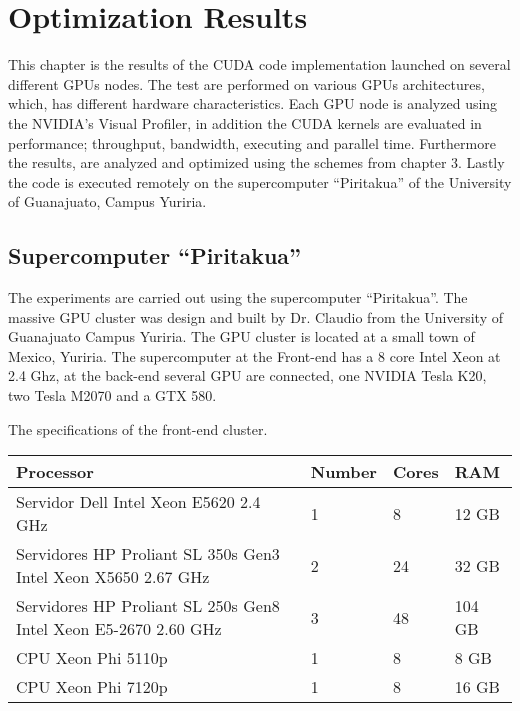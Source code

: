 
\chapter{Optimization Results} %

\label{Optimization Results} %



This chapter is the results of the CUDA code implementation launched on several different GPUs nodes. The test are performed on various GPUs architectures, which, has different hardware characteristics. Each GPU node is analyzed using the NVIDIA's Visual Profiler, in addition the CUDA kernels are evaluated in performance; throughput, bandwidth, executing and parallel time. Furthermore the results, are analyzed and optimized using the schemes from chapter 3. Lastly the code is executed remotely on the supercomputer ``Piritakua'' of the  University of Guanajuato, Campus Yuriria.

\section{Supercomputer ``Piritakua''}

The experiments are carried out using the supercomputer “Piritakua”. The massive GPU cluster was design and built by Dr. Claudio from the University of Guanajuato Campus Yuriria. The GPU cluster is located at a small town of Mexico, Yuriria. The supercomputer at the Front-end has a 8 core Intel Xeon at 2.4 Ghz, at the back-end several GPU are connected, one NVIDIA Tesla K20, two Tesla M2070 and a GTX 580.

The specifications of the front-end cluster.

\begin{tabular}{ | p{7.1cm}  | l | l | l |}
  \hline
  Processor & Number & Cores & RAM  \\
  \hline
  Servidor Dell Intel Xeon E5620 2.4 GHz & 1 & 8 & 12 GB \\
  \hline
  Servidores HP Proliant SL 350s Gen3 Intel Xeon X5650 2.67 GHz & 2 & 24 & 32 GB \\
  \hline
   Servidores HP Proliant SL 250s Gen8 Intel Xeon E5-2670 2.60 GHz & 3 & 48 &104 GB \\
   \hline
   CPU Xeon Phi  5110p & 1 & 8 & 8 GB\\
   \hline
   CPU Xeon Phi 7120p  & 1 & 8 & 16 GB\\
   \hline
  \end{tabular}


